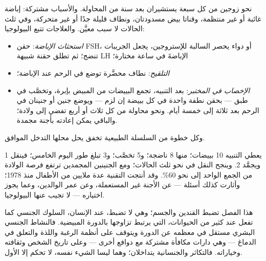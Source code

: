 \begin{proposition}\label{prop:g11:hormones-and-reproduction:art}
نحو زوجين من كل سبعة يستشيران بعد سنة من المحاولة. والأسباب مشتركة:
إباضة غائبة أو غير منتظمة، وقناتا بيض مسدودتان، ونطاف قليلة جدًا أو
غير متحركة، وفي ثلث الحالات لا سبب معيَّن. والعلاجات تتبع البيولوجيا:
\begin{itemize}
  \item \emph{استحثاث الإباضة}: حقن FSH، أو دواء يحصر 
        السالبة للإستروجين، يجعل الجريبات تنضج؛ ثم تطلق حقنة شبيهة
         LH الإباضةَ في ساعة مختارة؛
  \item \emph{التلقيح}: نطاف محضَّرة توضع في الرحم عند الإباضة؛
  \item \emph{الإخصاب في المختبر}: بعد التنبيه، تجمع البييضات من
        المبيض بإبرة، وتخصَّب في طبق --- بحقن نطفة واحدة في كل بييضة
        إن لزم --- ويوضع جنين أو جنينان في الرحم بعد ثلاثة إلى خمسة
        أيام. ونحو محاولة من كل ثلاث أو أربع تفضي إلى ولادة؛ والباقي
        يمكن إعادته بأجنة مجمدة.
\end{itemize}
وكل خطوة من السلسلة الطبيعية تخفق يحل محلها التدخل الموافق.
\end{proposition}
\admitted

\begin{example}\label{ex:g11:hormones-and-reproduction:ivf}
يعطي التنبيه 10 بييضات؛ منها 8 ناضجة؛ و5 تخصَّب؛ و3 تبلغ طور اليوم
الخامس؛ فينقل 1 ويجمَّد 2. وينجح النقل في نحو ثلث الحالات؛ ومع
الجنينين المجمدين ترتفع فرصة الولادة من الجمع الواحد إلى نحو 60\%. وقد
أنتجت التقنية عدة ملايين من الأطفال منذ 1978؛ وأثارت كذلك أسئلة ---
عن الأجنة غير المستعملة، وعن عمر الوالدين، وعما يجوز اختياره --- لا
تجيب عنها البيولوجيا.
\end{example}

\begin{remark}\label{rem:g11:hormones-and-reproduction:brain}
 هذا الفصل تضبط القندين والجسم؛ وهي لا تضبط، عند الإنسان،
السلوك الجنسي كما تفعل عند كثير من الحيوانات، التي يرتبط تزاوجها
بالدورة المبيضية. فالنشاط الجنسي البشري مستقل في معظمه عن الدورة
ويتوقف على أنظمة الرغبة واللذة والتعلق في الدماغ --- وهي دارات مكافأة
مشتركة مع دوافع أخرى --- وعلى تاريخ الشخص وثقافته وخياراته. فالتكاثر
والجنسانية يتداخلان؛ وهما ليسا الشيء نفسه،  لا تحكم إلا
الأول.
\end{remark}

